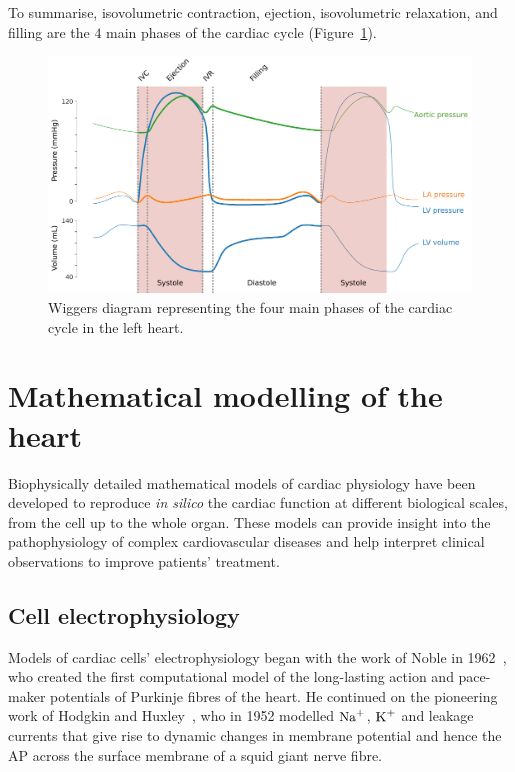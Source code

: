 \vspace{0.2cm}
To summarise, isovolumetric contraction, ejection, isovolumetric relaxation, and filling are the $4$ main phases of the cardiac cycle (Figure~\ref{fig:wiggersdiagram}).

\begin{figure}[ht!]
    \myfloatalign
    \includegraphics[width=\textwidth]{figures/chapter01/wiggers_diagram.pdf}
    \caption{Wiggers diagram representing the four main phases of the cardiac cycle in the left heart.}
    \label{fig:wiggersdiagram}
\end{figure}


%
%
%
\section{Mathematical modelling of the heart}\label{sec:ch1mathematical_modelling_of_the_heart}
Biophysically detailed mathematical models of cardiac physiology have been developed to reproduce \textit{in silico} the cardiac function at different biological scales, from the cell up to the whole organ. These models can provide insight into the pathophysiology of complex cardiovascular diseases and help interpret clinical observations to improve patients' treatment.


%
%
%
\subsection{Cell electrophysiology}\label{sec:cell_ep_modelling}
Models of cardiac cells' electrophysiology began with the work of Noble in 1962~\cite{Noble:1962}, who created the first computational model of the long-lasting action and pace-maker potentials of Purkinje fibres of the heart. He continued on the pioneering work of Hodgkin and Huxley~\cite{Hodgkin:1952}, who in 1952 modelled $\textrm{Na}^{+}$, $\textrm{K}^{+}$ and leakage currents that give rise to dynamic changes in membrane potential and hence the AP across the surface membrane of a squid giant nerve fibre. 

